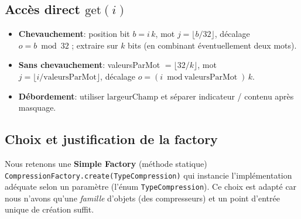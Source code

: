 \subsection{Accès direct $\mathrm{get}(i)$}
\begin{itemize}
  \item \textbf{Chevauchement}: position bit $b=i\,k$, mot $j=\lfloor b/32\rfloor$, décalage $o=b\bmod 32$ ; extraire sur $k$ bits (en combinant éventuellement deux mots).
  \item \textbf{Sans chevauchement}: valeursParMot $=\lfloor 32/k\rfloor$, mot $j=\lfloor i/\text{valeursParMot}\rfloor$, décalage $o=(i\bmod \text{valeursParMot})\,k$.
  \item \textbf{Débordement}: utiliser $\text{largeurChamp}$ et séparer indicateur / contenu après masquage.
\end{itemize}

\subsection{Choix et justification de la factory}
Nous retenons une \textbf{Simple Factory} (méthode statique) \texttt{CompressionFactory.create(TypeCompression)} qui instancie l'implémentation adéquate selon un paramètre (l'énum \texttt{TypeCompression}). Ce choix est adapté car nous n'avons qu'une \emph{famille} d'objets (des compresseurs) et un point d'entrée unique de création suffit.

